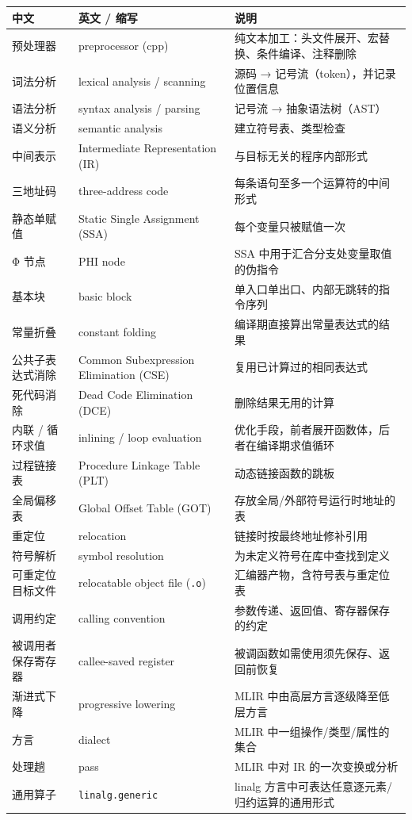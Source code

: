 \documentclass[UTF8,a4paper,10pt]{ctexart}
\newcommand{\headcol}{\bfseries}
\begin{document}
\begin{table}[H]
  \centering
  \small
  \setlength{\tabcolsep}{4pt}
  \begin{tabular}{>{\centering\arraybackslash}p{3.5cm}>{\centering\arraybackslash}p{5cm}>{\centering\arraybackslash}p{7.5cm}}
    \toprule
    \headcol 中文 & \headcol 英文 / 缩写 & \headcol 说明 \\
    \midrule
    预处理器 & preprocessor (cpp) & 纯文本加工：头文件展开、宏替换、条件编译、注释删除 \\
    词法分析 & lexical analysis / scanning & 源码 → 记号流（token），并记录位置信息 \\
    语法分析 & syntax analysis / parsing & 记号流 → 抽象语法树（AST） \\
    语义分析 & semantic analysis & 建立符号表、类型检查 \\
    中间表示 & Intermediate Representation (IR) & 与目标无关的程序内部形式 \\
    三地址码 & three-address code & 每条语句至多一个运算符的中间形式 \\
    静态单赋值 & Static Single Assignment (SSA) & 每个变量只被赋值一次 \\
    Φ 节点 & PHI node & SSA 中用于汇合分支处变量取值的伪指令 \\
    基本块 & basic block & 单入口单出口、内部无跳转的指令序列 \\
    常量折叠 & constant folding & 编译期直接算出常量表达式的结果 \\
    公共子表达式消除 & Common Subexpression Elimination (CSE) & 复用已计算过的相同表达式 \\
    死代码消除 & Dead Code Elimination (DCE) & 删除结果无用的计算 \\
    内联 / 循环求值 & inlining / loop evaluation & 优化手段，前者展开函数体，后者在编译期求值循环 \\
    过程链接表 & Procedure Linkage Table (PLT) & 动态链接函数的跳板 \\
    全局偏移表 & Global Offset Table (GOT) & 存放全局/外部符号运行时地址的表 \\
    重定位 & relocation & 链接时按最终地址修补引用 \\
    符号解析 & symbol resolution & 为未定义符号在库中查找到定义 \\
    可重定位目标文件 & relocatable object file (\texttt{.o}) & 汇编器产物，含符号表与重定位表 \\
    调用约定 & calling convention & 参数传递、返回值、寄存器保存的约定 \\
    被调用者保存寄存器 & callee-saved register & 被调函数如需使用须先保存、返回前恢复 \\
    渐进式下降 & progressive lowering & MLIR 中由高层方言逐级降至低层方言 \\
    方言 & dialect & MLIR 中一组操作/类型/属性的集合 \\
    处理趟 & pass & MLIR 中对 IR 的一次变换或分析 \\
    通用算子 & \texttt{linalg.generic} & linalg 方言中可表达任意逐元素/归约运算的通用形式 \\
    \bottomrule
  \end{tabular}
\end{table}
\end{document}
